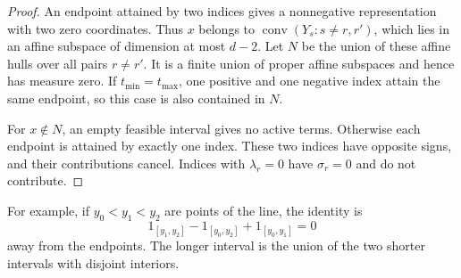 \documentclass[11pt]{article}
\theoremstyle{remark}
\newcommand{\conv}{\operatorname{conv}}
\newcommand{\one}{1}
\begin{document}
\begin{aiblock}
\begin{proof}
An endpoint attained by two indices gives a nonnegative representation with two zero coordinates. Thus $x$ belongs to
$\conv(Y_s:s\neq r,r')$, which lies in an affine subspace of dimension at most $d-2$. Let $N$ be the union of these affine hulls over all pairs $r\neq r'$. It is a finite union of proper affine subspaces and hence has measure zero. If $t_{\min}=t_{\max}$, one positive and one negative index attain the same endpoint, so this case is also contained in $N$.

For $x\notin N$, an empty feasible interval gives no active terms. Otherwise each endpoint is attained by exactly one index. These two indices have opposite signs, and their contributions cancel. Indices with $\lambda_r=0$ have $\sigma_r=0$ and do not contribute.
\end{proof}

For example, if $y_0<y_1<y_2$ are points of the line, the identity is
$$\one_{[y_1,y_2]}-\one_{[y_0,y_2]}+\one_{[y_0,y_1]}=0$$
away from the endpoints. The longer interval is the union of the two
shorter intervals with disjoint interiors.


\end{aiblock}
\end{document}
